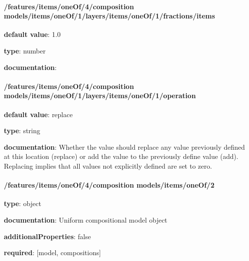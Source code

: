\begin{itemized}
\paragraph{/features/items/oneOf/4/composition models/items/oneOf/1/layers/items/oneOf/1/fractions/items} \begin{itemized}
\item {\bf default value}: 1.0
\item {\bf type}: number
\item {\bf documentation}: 
\end{itemized}\end{itemized}\paragraph{/features/items/oneOf/4/composition models/items/oneOf/1/layers/items/oneOf/1/operation} \begin{itemized}
\item {\bf default value}: replace
\item {\bf type}: string
\item {\bf documentation}: Whether the value should replace any value previously defined at this location (replace) or add the value to the previously define value (add). Replacing implies that all values not explicitly defined are set to zero.
\end{itemized}\paragraph{/features/items/oneOf/4/composition models/items/oneOf/2} \begin{itemized}
\item {\bf type}: object
\item {\bf documentation}: Uniform compositional model object
\item {\bf additionalProperties}: false
\item {\bf required}: [model, compositions]\end{itemized}
